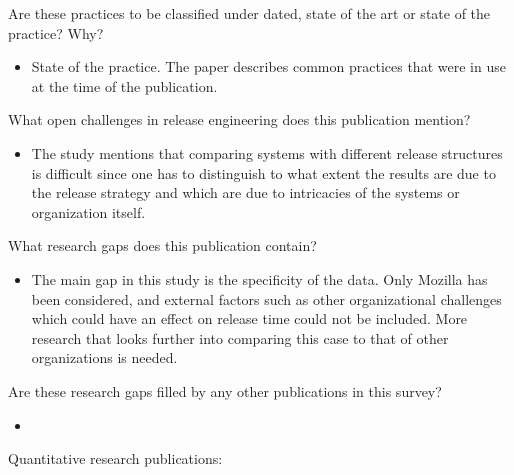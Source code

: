\documentclass[]{book}
\providecommand{\tightlist}{%
  \setlength{\itemsep}{0pt}\setlength{\parskip}{0pt}}
\begin{document}
Are these practices to be classified under dated, state of the art or
state of the practice? Why?

\begin{itemize}
\tightlist
\item
  State of the practice. The paper describes common practices that were
  in use at the time of the publication.
\end{itemize}

What open challenges in release engineering does this publication
mention?

\begin{itemize}
\tightlist
\item
  The study mentions that comparing systems with different release
  structures is difficult since one has to distinguish to what extent
  the results are due to the release strategy and which are due to
  intricacies of the systems or organization itself.
\end{itemize}

What research gaps does this publication contain?

\begin{itemize}
\tightlist
\item
  The main gap in this study is the specificity of the data. Only
  Mozilla has been considered, and external factors such as other
  organizational challenges which could have an effect on release time
  could not be included. More research that looks further into comparing
  this case to that of other organizations is needed.
\end{itemize}

Are these research gaps filled by any other publications in this survey?

\begin{itemize}
\item
\end{itemize}

Quantitative research publications:
\end{document}
